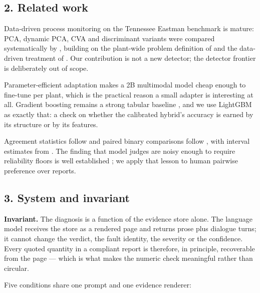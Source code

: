 \documentclass[
  10pt,
]{article}
\begin{document}
\subsection{2. Related work}\label{related-work}

Data-driven process monitoring on the Tennessee Eastman benchmark is
mature: PCA, dynamic PCA, CVA and discriminant variants were compared
systematically by \citep{yin2012comparison}, building on the plant-wide
problem definition of \citep{downs1993plant} and the data-driven
treatment of \citep{russell2000data}. Our contribution is not a new
detector; the detector frontier is deliberately out of scope.

Parameter-efficient adaptation \citep{hu2021lora} makes a 2B multimodal
model \citep{zhu2025internvl3} cheap enough to fine-tune per plant,
which is the practical reason a small adapter is interesting at all.
Gradient boosting remains a strong tabular baseline
\citep{ke2017lightgbm}, and we use LightGBM as exactly that: a check on
whether the calibrated hybrid's accuracy is earned by its structure or
by its features.

Agreement statistics follow \citep{cohen1960coefficient} and paired
binary comparisons follow \citep{mcnemar1947note}, with interval
estimates from \citep{clopper1934use}. The finding that model judges are
noisy enough to require reliability floors is well established
\citep{zheng2023judging}; we apply that lesson to human pairwise
preference over reports.

\subsection{3. System and invariant}\label{system-and-invariant}

\textbf{Invariant.} The diagnosis is a function of the evidence store
alone. The language model receives the store as a rendered page and
returns prose plus dialogue turns; it cannot change the verdict, the
fault identity, the severity or the confidence. Every quoted quantity in
a compliant report is therefore, in principle, recoverable from the page
--- which is what makes the numeric check meaningful rather than
circular.

Five conditions share one prompt and one evidence renderer:
\end{document}
